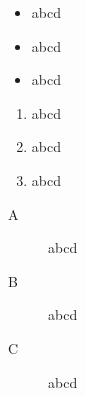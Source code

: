 \documentclass{article}
\begin{document}
\begin{itemize}
\item abcd
\item abcd
\item abcd
\end{itemize}
\begin{enumerate}
\item abcd
\item abcd
\item abcd
\end{enumerate}
\begin{description}
\item[A] abcd
\item[B] abcd
\item[C] abcd
\end{description}
\end{document}
